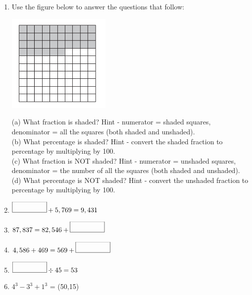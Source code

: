 \documentclass{article}
\begin{document}
\begin{enumerate}

\item \quad  Use the figure below to answer the questions that follow: 

\includegraphics[width=5cm]{Year_6_Mixed_Tests/Homework_Tasks/Shaded_grid_1.png}

(a) What fraction is shaded? Hint - numerator = shaded squares, denominator = all the squares (both shaded and unshaded). \\

(b) What percentage is shaded? Hint - convert the shaded fraction to percentage by multiplying by 100.\\

(c) What fraction is NOT shaded? Hint - numerator =  unshaded squares, denominator = the number of all the squares (both shaded and unshaded).\\

(d) What percentage is NOT shaded? Hint - convert the unshaded fraction to percentage by multiplying by 100. \\

\item \quad \( \framebox(50,15){} + 5,769 = 9,431 \)

\item \quad \( 87,837 = 82,546 + \framebox(50,15){} \)

\item \quad \( 4,586 + 469 = 569 + \framebox(50,15){} \)

\item \quad \( \framebox(50,15){} \div 45 = 53  \)

\item \quad \( 4^{3} - 3^{3} + 1^{3}  \) = \framebox(50,15){}


\end{enumerate}
\end{document}
